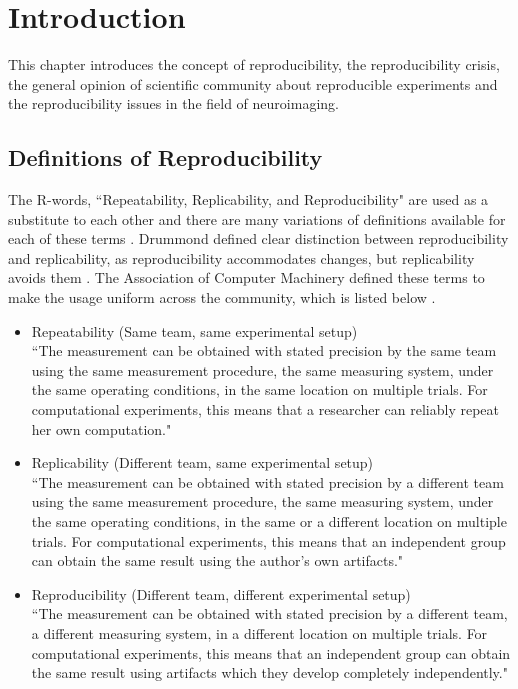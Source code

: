 \chapter{Introduction}
This chapter introduces the concept of reproducibility, the reproducibility crisis, the general opinion of scientific community about reproducible experiments and the reproducibility issues in the field of neuroimaging. 

\section{Definitions of Reproducibility}

The R-words, ``Repeatability, Replicability, and Reproducibility" are used as a substitute to each other and there are many variations of definitions available for each of these terms \cite{Plesser2018}. Drummond defined clear distinction between reproducibility and replicability, as reproducibility accommodates changes, but replicability avoids them \cite{Drummond}. The Association of Computer Machinery defined these terms to make the usage uniform across the community, which is listed below \cite{ACM2016}.

\begin{itemize}
\item {Repeatability (Same team, same experimental setup)\\}
      ``The measurement can be obtained with stated precision by the same team using the same measurement procedure, the same measuring system, under the same operating conditions, in the same location on multiple trials. For computational experiments, this means that a researcher can reliably repeat her own computation."
\item{Replicability (Different team, same experimental setup)\\}
      ``The measurement can be obtained with stated precision by a different team using the same measurement procedure, the same measuring system, under the same operating conditions, in the same or a different location on multiple trials. For computational experiments, this means that an independent group can obtain the same result using the author's own artifacts."
\item{Reproducibility (Different team, different experimental setup)\\}
      ``The measurement can be obtained with stated precision by a different team, a different measuring system, in a different location on multiple trials. For computational experiments, this means that an independent group can obtain the same result using artifacts which they develop completely independently."
\end{itemize}


